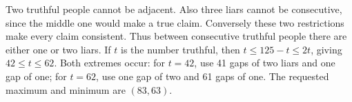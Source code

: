 Two truthful people cannot be adjacent. Also three liars cannot be consecutive, since the middle one would make a true claim. Conversely these two restrictions make every claim consistent. Thus between consecutive truthful people there are either one or two liars. If $t$ is the number truthful, then $t\le125-t\le2t$, giving $42\le t\le62$. Both extremes occur: for $t=42$, use 41 gaps of two liars and one gap of one; for $t=62$, use one gap of two and 61 gaps of one. The requested maximum and minimum are $\boxed{(83,63)}$.
